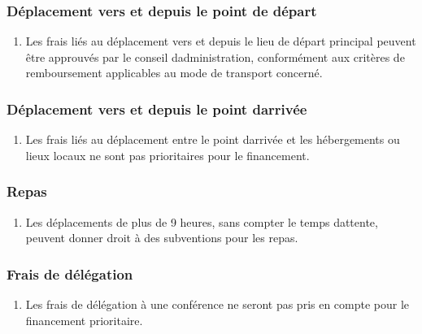 \subsubsection{Déplacement vers et depuis le point de départ}
\label{deplacement-vers-et-depuis-le-point-de-depart}

\begin{enumerate}
 \item
  Les frais liés au déplacement vers et depuis le lieu de départ principal peuvent être approuvés par le conseil d\textquotesingle administration, conformément aux critères de remboursement applicables au mode de transport concerné.
\end{enumerate}

\subsubsection{Déplacement vers et depuis le point d\textquotesingle arrivée}
\label{deplacement-vers-et-depuis-le-point-d-arrivee}

\begin{enumerate}
 \item
  Les frais liés au déplacement entre le point d\textquotesingle arrivée et les hébergements ou lieux locaux ne sont pas prioritaires pour le financement.
\end{enumerate}

\subsubsection{Repas}
\label{repas}

\begin{enumerate}
 \item
  Les déplacements de plus de 9 heures, sans compter le temps d\textquotesingle attente, peuvent donner droit à des subventions pour les repas.
\end{enumerate}

\subsubsection{Frais de délégation}
\label{frais-de-delegation}

\begin{enumerate}
 \item
  Les frais de délégation à une conférence ne seront pas pris en compte pour le financement prioritaire.
\end{enumerate}

